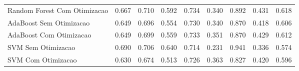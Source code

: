 \begin{table}[H]
\begin{adjustwidth}{ -1in }{ -1in }
\begin{tabular}{lrrrrrrrr}
      Random Forest Com Otimizacao &                        0.667 &                         0.710 &                            0.592 &                            0.734 &                          0.340 &                          0.892 &                                     0.431 &                                 0.618 \\
           AdaBoost Sem Otimizacao &                        0.649 &                         0.696 &                            0.554 &                            0.730 &                          0.340 &                          0.870 &                                     0.418 &                                 0.606 \\
           AdaBoost Com Otimizacao &                        0.649 &                         0.699 &                            0.559 &                            0.733 &                          0.351 &                          0.870 &                                     0.429 &                                 0.612 \\
                SVM Sem Otimizacao &                        0.690 &                         0.706 &                            0.640 &                            0.714 &                          0.231 &                          0.941 &                                     0.336 &                                 0.574 \\
                SVM Com Otimizacao &                        0.630 &                         0.674 &                            0.513 &                            0.726 &                          0.363 &                          0.827 &                                     0.420 &                                 0.596 \\
\bottomrule
\end{tabular}
    \end{adjustwidth}
    \renewcommand{\arraystretch}{1.0} %
\end{table}
